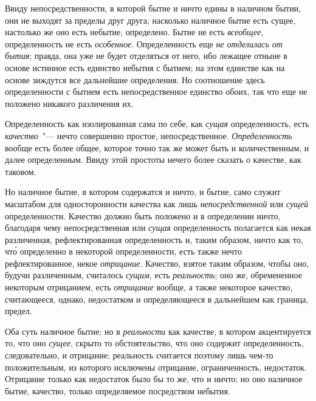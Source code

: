 Ввиду непосредственности, в которой бытие и ничто
едины в наличном бытии, они не выходят за пределы
друг друга; насколько наличное бытие есть сущее, настолько
же оно есть небытие, определено. Бытие не есть
\emph{всеобщее}, определенность не есть \emph{особенное}. Определенность
еще \emph{не отделилась от бытия}; правда, она уже не
будет отделяться от него, ибо лежащее отныне в основе
истинное есть единство небытия с бытием; на этом единстве
как на основе зиждутся все дальнейшие определения.
Но соотношение здесь определенности с бытием
есть непосредственное единство обоих, так что еще не
положено никакого различения их.

Определенность как изолированная сама по себе, как
\emph{сущая} определенность, есть \emph{качество}~"--- нечто совершенно
простое, непосредственное. \emph{Определенность} вообще есть
более общее, которое точно так же может быть и количественным,
и далее определенным. Ввиду этой простоты
нечего более сказать о качестве, как таковом.

Но наличное бытие, в котором содержатся и ничто, и
бытие, само служит масштабом для односторонности качества
как лишь \emph{непосредственной} или \emph{сущей} определенности.
Качество должно быть положено и в определении
ничто, благодаря чему непосредственная или \emph{сущая} определенность
полагается как некая различенная, рефлектированная
определенность и, таким образом, ничто как то,
чт\'о определенно в некоторой определенности, есть также
нечто рефлектированное, некое \emph{отрицание}. Качество, взятое
таким образом, чтобы оно, будучи различенным, считалось
\emph{сущим}, есть \emph{реальность}; оно же, обремененное некоторым
отрицанием, есть \emph{отрицание} вообще, а также
некоторое качество, считающееся, однако, недостатком и
определяющееся в дальнейшем как граница, предел.

Оба суть наличное бытие; но в \emph{реальности} как качестве,
в котором акцентируется то, что оно \emph{сущее}, скрыто
то обстоятельство, что оно содержит определенность, следовательно,
и отрицание; реальность считается поэтому
лишь чем-то положительным, из которого исключены
отрицание, ограниченность, недостаток. Отрицание только
как недостаток было бы то же, что и ничто; но оно
наличное бытие, качество, только определяемое посредством
небытия.


